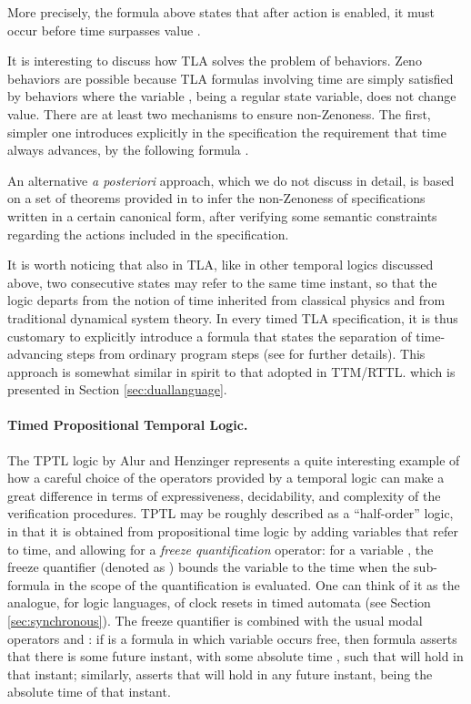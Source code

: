 More precisely, the formula above states that after action  is enabled,
it must occur before time surpasses value .

It is interesting to discuss how TLA solves the problem of  
behaviors. Zeno behaviors are possible because TLA formulas involving 
time are simply satisfied by behaviors where the variable , 
being a regular state variable, does not change value. There 
are at least two mechanisms to ensure non-Zenoness. The first, 
simpler one introduces explicitly in the specification the requirement 
that time always advances, by the following formula . 
  
  An alternative \emph{a posteriori} approach, which we do not discuss
  in detail, is based on a set of theorems provided in \cite{AL94} to
  infer the non-Zenoness of specifications written in a certain
  canonical form, after verifying some semantic constraints regarding
  the actions included in the specification.

It is worth noticing that also in TLA, like in other temporal 
logics discussed above, two consecutive states may refer to the 
same time instant, so that the logic departs from the notion 
of time inherited from classical physics and from traditional 
dynamical system theory. In every timed TLA specification, it 
is thus customary to explicitly introduce a formula that states 
the separation of time-advancing steps from ordinary program 
steps (see \cite{AL94} for further details). This 
approach is somewhat similar in spirit to that adopted in TTM/RTTL. which is presented in Section \ref{sec:duallanguage}.


\paragraph{Timed Propositional Temporal Logic.}
The TPTL logic by Alur and Henzinger represents a quite interesting 
example of how a careful choice of the operators provided by 
a temporal logic can make a great difference in terms of expressiveness, 
decidability, and complexity of the verification procedures. 
TPTL may be roughly described as a ``half-order'' logic, in that 
it is obtained from propositional  time logic by adding 
variables that refer to time, and allowing for a \emph{freeze quantification} 
operator: for a variable , the freeze quantifier (denoted 
as ) bounds the variable  to the time when the sub-formula in 
the scope of the quantification is evaluated. One can think of 
it as the analogue, for logic languages, of clock resets in timed 
automata (see Section \ref{sec:synchronous}). The freeze quantifier is combined 
with the usual modal operators  and : if 
is a formula in which variable  occurs free, then formula 
asserts that there is some future instant, with some absolute 
time , such that  will hold in that instant; 
similarly,  asserts that 
will hold in any future instant,  being the absolute time 
of that instant.

